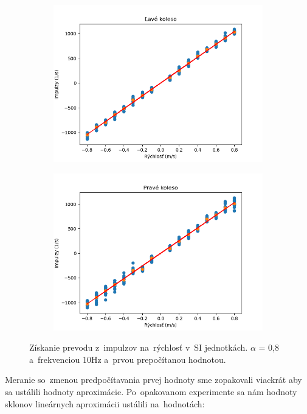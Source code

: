 \begin{figure}[!htbp]
	\begin{subfigure}{0.5\textwidth}
		\includegraphics[width=\textwidth]{img/lw_08100_3.png}
	\end{subfigure}
	\hfill
	\begin{subfigure}{0.5\textwidth}
		\includegraphics[width=\textwidth]{img/rw_08100_3.png}
	\end{subfigure}
	\caption{Získanie prevodu z~impulzov na~rýchlosť v~SI jednotkách. $\alpha$ = 0,8 a~frekvenciou 10Hz a~prvou prepočítanou hodnotou.}
	\label{fig:rw_lw_08100_3}
\end{figure}

Meranie so~zmenou predpočítavania prvej hodnoty sme zopakovali viackrát aby sa ustálili hodnoty aproximácie.
Po~opakovanom experimente sa nám hodnoty sklonov lineárnych aproximácii ustálili na~hodnotách:

